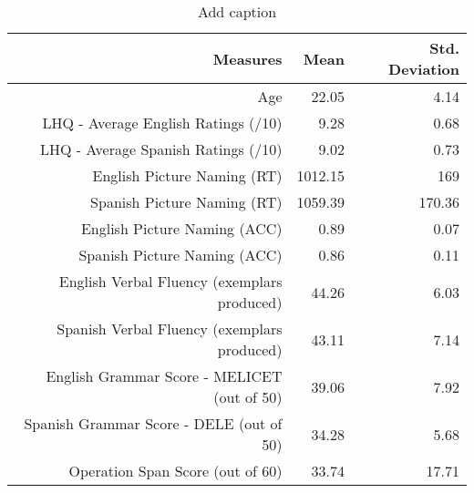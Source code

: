 \begin{table}[htbp]
  \centering
  \caption{Add caption}
    \begin{tabular}{rrr}
    \toprule
    Measures & Mean  & Std. Deviation \\
    \midrule
    Age   & 22.05 & 4.14 \\
    LHQ - Average English Ratings (/10) & 9.28  & 0.68 \\
    LHQ - Average Spanish Ratings (/10) & 9.02  & 0.73 \\
    English Picture Naming (RT) & 1012.15 & 169 \\
    Spanish Picture Naming (RT) & 1059.39 & 170.36 \\
    English Picture Naming (ACC) & 0.89  & 0.07 \\
    Spanish Picture Naming (ACC) & 0.86  & 0.11 \\
    English Verbal Fluency (exemplars produced) & 44.26 & 6.03 \\
    Spanish Verbal Fluency (exemplars produced) & 43.11 & 7.14 \\
    English Grammar Score - MELICET (out of 50) & 39.06 & 7.92 \\
    Spanish Grammar Score - DELE (out of 50) & 34.28 & 5.68 \\
    Operation Span Score (out of 60) & 33.74 & 17.71 \\
    \bottomrule
    \end{tabular}%
  \label{tab:addlabel}%
\end{table}%
